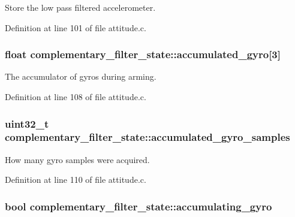 \-Store the low pass filtered accelerometer. 



\-Definition at line 101 of file attitude.\-c.

\hypertarget{structcomplementary__filter__state_ada568dc8edca423fd6744e58049272e9}{
\subsubsection[{accumulated\-\_\-gyro}]{\setlength{\rightskip}{0pt plus 5cm}float {\bf complementary\-\_\-filter\-\_\-state\-::accumulated\-\_\-gyro}\mbox{[}3\mbox{]}}}\label{structcomplementary__filter__state_ada568dc8edca423fd6744e58049272e9}


\-The accumulator of gyros during arming. 



\-Definition at line 108 of file attitude.\-c.

\hypertarget{structcomplementary__filter__state_ae32da25bd01d785b59379dea487222dc}{
\subsubsection[{accumulated\-\_\-gyro\-\_\-samples}]{\setlength{\rightskip}{0pt plus 5cm}uint32\-\_\-t {\bf complementary\-\_\-filter\-\_\-state\-::accumulated\-\_\-gyro\-\_\-samples}}}\label{structcomplementary__filter__state_ae32da25bd01d785b59379dea487222dc}


\-How many gyro samples were acquired. 



\-Definition at line 110 of file attitude.\-c.

\hypertarget{structcomplementary__filter__state_a0a5740a2b1f2c69d56ee1c5d4ace3d20}{
\subsubsection[{accumulating\-\_\-gyro}]{\setlength{\rightskip}{0pt plus 5cm}bool {\bf complementary\-\_\-filter\-\_\-state\-::accumulating\-\_\-gyro}}}\label{structcomplementary__filter__state_a0a5740a2b1f2c69d56ee1c5d4ace3d20}


